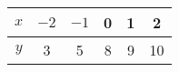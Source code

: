 \begin{tabular}{|c|c|c|c|c|c|}
\hline
   $x$  & $-2$ & $-1$ & 0 & 1 & 2 \\
   \hline
    $y$ & 3 & 5 & 8 & 9 & 10 \\
    \hline
\end{tabular}